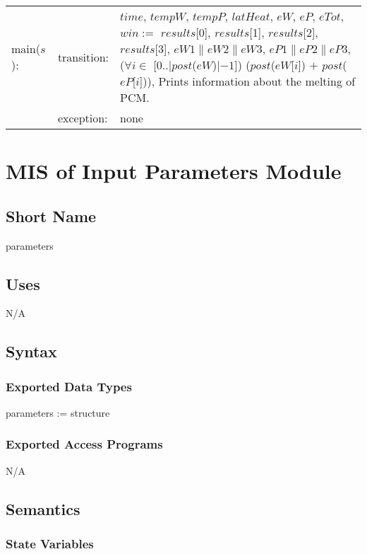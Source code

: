 \documentclass[12pt]{article}
\begin{document}
\begin{tabular}{l l p{12cm}}
main($s$): & transition: & $time$, $tempW$, $tempP$, $latHeat$, $eW$, $eP$, $eTot$, $win :=$ $results$[0], $results$[1], $results$[2], $results$[3], $eW1 \| eW2 \| eW3$, $eP1 \| eP2 \| eP3$, ($\forall i \in$ [0..$|post$($eW$)$| - 1$]) ($post$($eW$[$i$]) $+$ $post$($eP$[$i$])), Prints information about the melting of PCM. \\
& exception: & none \\
\end{tabular}

\section{MIS of Input Parameters Module} \label{Parameters}

\subsection{Short Name}

parameters

\subsection{Uses}

N/A

\subsection{Syntax}

\subsubsection{Exported Data Types}

parameters := structure

\subsubsection{Exported Access Programs}

N/A

\subsection{Semantics}

\subsubsection{State Variables}
\end{document}
